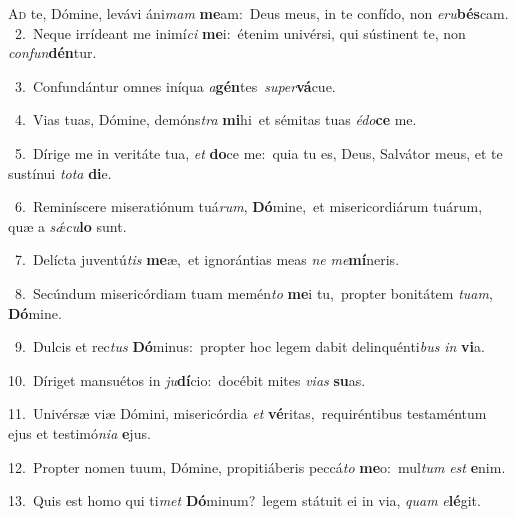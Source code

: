 \lettrine{\initial\textcolor{\initialcolor}{A}}{d} te, Dómine, levávi áni\textit{mam} \textbf{me}\-am:~\star Deus meus, in te confído, non \textit{e}\-\textit{ru}\textbf{bés}cam.\\
{\numbfont\textcolor{\numbcolor}{~2.}}~Neque irrídeant me inimí\textit{ci} \textbf{me}\-i:~\star étenim univérsi, qui sústinent te, non \textit{con}\-\textit{fun}\textbf{dén}tur.\par
{\numbfont\textcolor{\numbcolor}{~3.}}~Confundántur omnes iníqua \textit{a}\-\textbf{gén}tes~\star \textit{su}\-\textit{per}\textbf{vá}cue.\par
{\numbfont\textcolor{\numbcolor}{~4.}}~Vias tuas, Dómine, demóns\textit{tra} \textbf{mi}\-hi~\star et sémitas tuas \textit{é}\-\textit{do}\textbf{ce} me.\par
{\numbfont\textcolor{\numbcolor}{~5.}}~Dírige me in veritáte tua, \textit{et} \textbf{do}\-ce me:~\star quia tu es, Deus, Salvátor meus, et te sustínui \textit{to}\-\textit{ta} \textbf{di}\-e.\par
{\numbfont\textcolor{\numbcolor}{~6.}}~Reminíscere miseratiónum tuá\-\textit{rum}\-, \textbf{Dó}\-mine,~\star et misericordiárum tuárum, quæ a \textit{sǽ}\-\textit{cu}\textbf{lo} sunt.\par
{\numbfont\textcolor{\numbcolor}{~7.}}~Delícta juventú\textit{tis} \textbf{me}\-æ,~\star et ignorántias meas \textit{ne} \textit{me}\-\textbf{mí}neris.\par
{\numbfont\textcolor{\numbcolor}{~8.}}~Secúndum misericórdiam tuam memén\textit{to} \textbf{me}\-i tu,~\star propter bonitátem \textit{tu}\-\textit{am}, \textbf{Dó}\-mine.\par
{\numbfont\textcolor{\numbcolor}{~9.}}~Dulcis et rec\textit{tus} \textbf{Dó}\-minus:~\star propter hoc legem dabit delinquénti\textit{bus} \textit{in} \textbf{vi}\-a.\par
{\numbfont\textcolor{\numbcolor}{10.}}~Díriget mansuétos in \textit{ju}\-\textbf{dí}cio:~\star docébit mites \textit{vi}\-\textit{as} \textbf{su}\-as.\par
{\numbfont\textcolor{\numbcolor}{11.}}~Univérsæ viæ Dómini, misericórdia \textit{et} \textbf{vé}\-ritas,~\star requiréntibus testaméntum ejus et testimó\-\textit{ni}\-\textit{a} \textbf{e}\-jus.\par
{\numbfont\textcolor{\numbcolor}{12.}}~Propter nomen tuum, Dómine, propitiáberis peccá\textit{to} \textbf{me}\-o:~\star mul\textit{tum} \textit{est} \textbf{e}\-nim.\par
{\numbfont\textcolor{\numbcolor}{13.}}~Quis est homo qui ti\textit{met} \textbf{Dó}\-minum?~\star legem státuit ei in via, \textit{quam} \textit{e}\-\textbf{lé}git.\par
